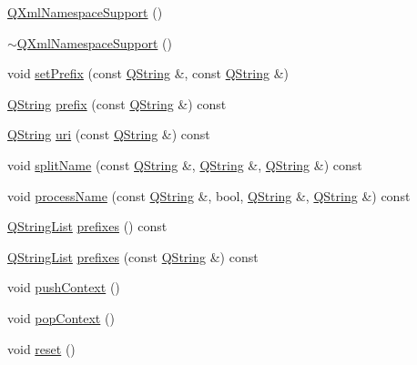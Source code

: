 \begin{DoxyCompactItemize}
\item 
\mbox{\hyperlink{class_q_xml_namespace_support_a8d2d913ace7a2f2d40cf625ac08c033c}{Q\+Xml\+Namespace\+Support}} ()
\item 
\mbox{\hyperlink{class_q_xml_namespace_support_ad05d7bc400ce90e5efca49a51f8c4372}{$\sim$\+Q\+Xml\+Namespace\+Support}} ()
\item 
void \mbox{\hyperlink{class_q_xml_namespace_support_a21b28d3ac78e3226fe29d8b31d4fbf34}{set\+Prefix}} (const \mbox{\hyperlink{class_q_string}{Q\+String}} \&, const \mbox{\hyperlink{class_q_string}{Q\+String}} \&)
\item 
\mbox{\hyperlink{class_q_string}{Q\+String}} \mbox{\hyperlink{class_q_xml_namespace_support_a3799ab420cf2a762eb74929fdf5707e5}{prefix}} (const \mbox{\hyperlink{class_q_string}{Q\+String}} \&) const
\item 
\mbox{\hyperlink{class_q_string}{Q\+String}} \mbox{\hyperlink{class_q_xml_namespace_support_a6c16aac98314cd385f6442308482ce1b}{uri}} (const \mbox{\hyperlink{class_q_string}{Q\+String}} \&) const
\item 
void \mbox{\hyperlink{class_q_xml_namespace_support_a6084f67775d7760c596495bd4ad0536d}{split\+Name}} (const \mbox{\hyperlink{class_q_string}{Q\+String}} \&, \mbox{\hyperlink{class_q_string}{Q\+String}} \&, \mbox{\hyperlink{class_q_string}{Q\+String}} \&) const
\item 
void \mbox{\hyperlink{class_q_xml_namespace_support_a8480cd143138de4d1ec6dc552fcaf801}{process\+Name}} (const \mbox{\hyperlink{class_q_string}{Q\+String}} \&, bool, \mbox{\hyperlink{class_q_string}{Q\+String}} \&, \mbox{\hyperlink{class_q_string}{Q\+String}} \&) const
\item 
\mbox{\hyperlink{class_q_string_list}{Q\+String\+List}} \mbox{\hyperlink{class_q_xml_namespace_support_a502bb683754cbb33cbd4ea53283e6f79}{prefixes}} () const
\item 
\mbox{\hyperlink{class_q_string_list}{Q\+String\+List}} \mbox{\hyperlink{class_q_xml_namespace_support_a09a2fcb07f715049c35dd6176dd8f6b8}{prefixes}} (const \mbox{\hyperlink{class_q_string}{Q\+String}} \&) const
\item 
void \mbox{\hyperlink{class_q_xml_namespace_support_a31a7b184ba03b3d61cde7a5def4cff77}{push\+Context}} ()
\item 
void \mbox{\hyperlink{class_q_xml_namespace_support_ab36c81f4e2e0be48ba2b4ac23e67a578}{pop\+Context}} ()
\item 
void \mbox{\hyperlink{class_q_xml_namespace_support_a9a8940bd95ef75274b9560c3e4358bce}{reset}} ()
\end{DoxyCompactItemize}


